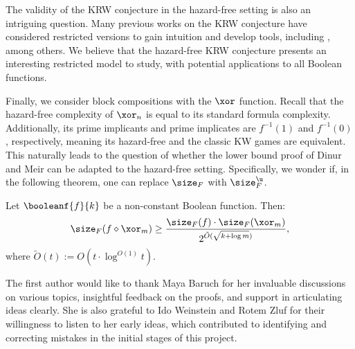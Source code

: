 \documentclass[acmsmall, nonacm, authorversion]{acmart}
\begin{document}
The validity of the KRW conjecture in the hazard-free setting is also an intriguing question. Many previous works on the KRW conjecture have considered restricted versions to gain intuition and develop tools, including \cite{KRW95, hw92, EIRS01, GMWW17, km18, Mei20}, among others. We believe that the hazard-free KRW conjecture presents an interesting restricted model to study, with potential applications to all Boolean functions.

\conjhazardfreekrw*

Finally, we consider block compositions with the $\xor$ function. Recall that the hazard-free complexity of $\xor_n$ is equal to its standard formula complexity. Additionally, its prime implicants and prime implicates are $f^{-1}(1)$ and $f^{-1}(0)$, respectively, meaning its hazard-free and the classic KW games are equivalent. This naturally leads to the question of whether the lower bound proof of Dinur and Meir  \cite{DM18} can be adapted to the hazard-free setting.
Specifically, we wonder if, in the following theorem, one can replace $\size_F$ with $\size_F^{\u}$.

\begin{theorem}\label{thm:parity-composition}
Let $\booleanf{f}{k}$ be a non-constant Boolean function. Then:
\[
\size_F(f\diamond \xor_m)\ge \frac{\size_F(f)\cdot \size_F(\xor_m)}{2^{\tilde{O}(\sqrt{k+\log m})}},
\]
where $\tilde{O}(t):=O(t\cdot \log^{O(1)}t)$. 
\end{theorem}

\begin{acks}
The first author would like to thank Maya Baruch for her invaluable discussions on various topics, insightful feedback on the proofs, and support in articulating ideas clearly. She is also grateful to Ido Weinstein and Rotem Zluf for their willingness to listen to her early ideas, which contributed to identifying and correcting mistakes in the initial stages of this project.
\end{acks}



\end{document}
